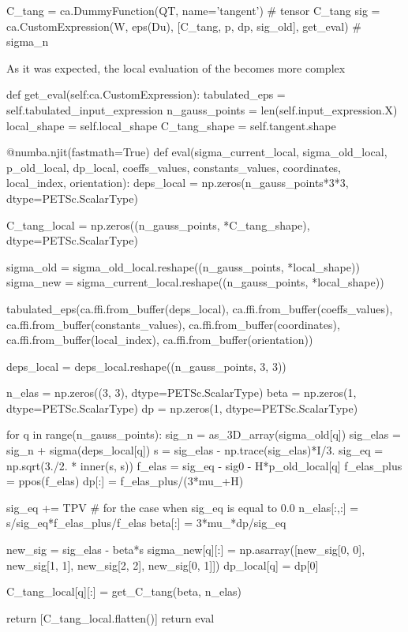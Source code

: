 \documentclass[12pt]{article}
\begin{document}
\begin{pythoncode}
    C_tang = ca.DummyFunction(QT, name='tangent') # tensor C_tang
    sig = ca.CustomExpression(W, eps(Du), [C_tang, p, dp, sig_old], get_eval) # sigma_n
\end{pythoncode}
As it was expected, the local evaluation of the  becomes more complex 
\begin{pythoncode}
    def get_eval(self:ca.CustomExpression):
        tabulated_eps = self.tabulated_input_expression
        n_gauss_points = len(self.input_expression.X)
        local_shape = self.local_shape
        C_tang_shape = self.tangent.shape

        @numba.njit(fastmath=True)
        def eval(sigma_current_local, sigma_old_local, p_old_local, dp_local, 
                 coeffs_values, constants_values, coordinates, local_index, orientation):
            deps_local = np.zeros(n_gauss_points*3*3, dtype=PETSc.ScalarType)
            
            C_tang_local = np.zeros((n_gauss_points, *C_tang_shape), dtype=PETSc.ScalarType)
            
            sigma_old = sigma_old_local.reshape((n_gauss_points, *local_shape))
            sigma_new = sigma_current_local.reshape((n_gauss_points, *local_shape))

            tabulated_eps(ca.ffi.from_buffer(deps_local), 
                          ca.ffi.from_buffer(coeffs_values), 
                          ca.ffi.from_buffer(constants_values), 
                          ca.ffi.from_buffer(coordinates), 
                          ca.ffi.from_buffer(local_index), 
                          ca.ffi.from_buffer(orientation))
            
            deps_local = deps_local.reshape((n_gauss_points, 3, 3))

            n_elas = np.zeros((3, 3), dtype=PETSc.ScalarType) 
            beta = np.zeros(1, dtype=PETSc.ScalarType) 
            dp = np.zeros(1, dtype=PETSc.ScalarType) 

            for q in range(n_gauss_points):
                sig_n = as_3D_array(sigma_old[q])
                sig_elas = sig_n + sigma(deps_local[q])
                s = sig_elas - np.trace(sig_elas)*I/3.
                sig_eq = np.sqrt(3./2. * inner(s, s))
                f_elas = sig_eq - sig0 - H*p_old_local[q]
                f_elas_plus = ppos(f_elas)
                dp[:] = f_elas_plus/(3*mu_+H)
                
                sig_eq += TPV # for the case when sig_eq is equal to 0.0
                n_elas[:,:] = s/sig_eq*f_elas_plus/f_elas
                beta[:] = 3*mu_*dp/sig_eq
        
                new_sig = sig_elas - beta*s
                sigma_new[q][:] = np.asarray([new_sig[0, 0], new_sig[1, 1], new_sig[2, 2], new_sig[0, 1]])
                dp_local[q] = dp[0]
                
                C_tang_local[q][:] = get_C_tang(beta, n_elas)
            
            return [C_tang_local.flatten()] 
        return eval
\end{pythoncode}
\end{document}
